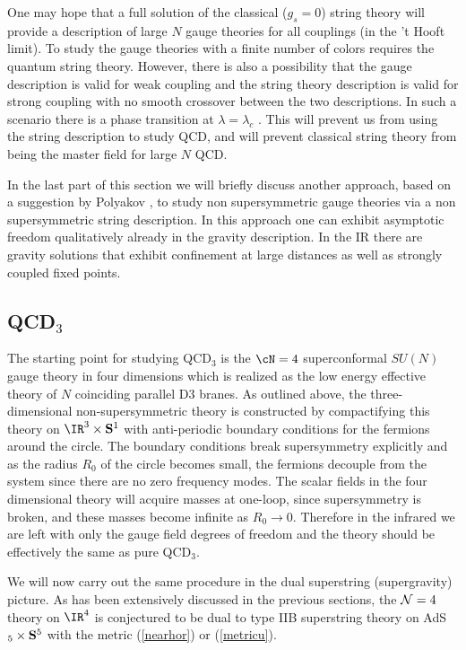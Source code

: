 One may hope that a full solution of the classical ($g_s=0$) string
theory will provide a description of large $N$ gauge theories for all
couplings (in the 't Hooft limit).  To study the gauge theories with a
finite number of colors requires the quantum string theory.  However,
there is also a possibility that the gauge description is valid for
weak coupling and the string theory description is valid for strong
coupling with no smooth crossover between the two descriptions.  In
such a scenario there is a phase transition at $\lambda = \lambda_c$ 
\cite{Li:1999kd,Gao:1998ww}.
This will prevent us from using the string description to study QCD,
and will prevent classical string theory from being the master field
for large $N$ QCD.

In the last part of this section we will briefly discuss another
approach, based on a suggestion by Polyakov \cite{Polyakov:1998ju}, to
study non supersymmetric gauge theories via a non supersymmetric
string description. In this approach one can exhibit asymptotic
freedom qualitatively already in the gravity description.  In the IR
there are gravity solutions that exhibit confinement at large
distances as well as strongly coupled fixed points.


 

\subsection{QCD$_3$}


The starting point for studying QCD$_3$ is the $\cN=4$ superconformal
$SU(N)$ gauge theory in four dimensions which is realized as the low
energy effective theory of $N$ coinciding parallel D3 branes.  As
outlined above, the three-dimensional non-supersymmetric theory is
constructed by compactifying this theory on $\IR^3 \times {\bf S}^1$
with anti-periodic boundary conditions for the fermions around the
circle. The boundary conditions break supersymmetry explicitly and as
the radius $R_0$ of the circle becomes small, the fermions decouple
from the system since there are no zero frequency modes.  The scalar
fields in the four dimensional theory will acquire masses at one-loop,
since supersymmetry is broken, and these masses become infinite as
$R_0 \rightarrow 0$.  Therefore in the infrared we are left with only
the gauge field degrees of freedom and the theory should be
effectively the same as pure QCD$_3$.

We will now carry out the same procedure in the dual superstring
(supergravity) picture.  As has been extensively discussed in the
previous sections, the ${\cal N}=4$ theory on $\IR^4$ is
conjectured to be dual to type IIB superstring theory on AdS$_5 \times
{\bf S}^5$ with the metric (\ref{nearhor}) or (\ref{metricu}).
 
